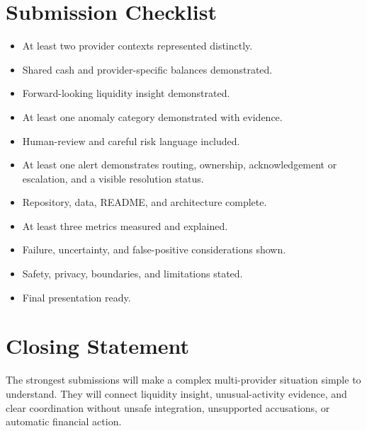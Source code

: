 \documentclass[11pt,a4paper]{article}
\begin{document}
\section{Submission Checklist}
\begin{itemize}[noitemsep]
    \item At least two provider contexts represented distinctly.
    \item Shared cash and provider-specific balances demonstrated.
    \item Forward-looking liquidity insight demonstrated.
    \item At least one anomaly category demonstrated with evidence.
    \item Human-review and careful risk language included.
    \item At least one alert demonstrates routing, ownership, acknowledgement or escalation, and a visible resolution status.
    \item Repository, data, README, and architecture complete.
    \item At least three metrics measured and explained.
    \item Failure, uncertainty, and false-positive considerations shown.
    \item Safety, privacy, boundaries, and limitations stated.
    \item Final presentation ready.
\end{itemize}

\section{Closing Statement}
The strongest submissions will make a complex multi-provider situation simple to understand. They will connect liquidity insight, unusual-activity evidence, and clear coordination without unsafe integration, unsupported accusations, or automatic financial action.
\end{document}
